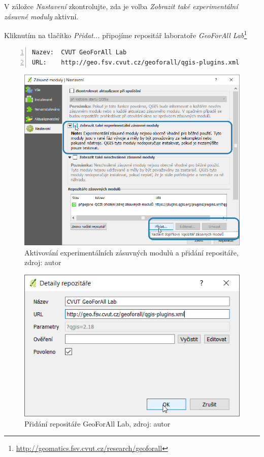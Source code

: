 V záložce \textit{Nastavení} zkontrolujte, zda je volba \textit{Zobrazit také experimentální zásuvné moduly} aktivní.

Kliknutím na tlačítko \textit{Přidat...} připojíme repositář laboratoře \textit{GeoForAll Lab}\footnote{\url{http://geomatics.fsv.cvut.cz/research/geoforall}}

\begin{lstlisting}[basicstyle=\footnotesize\ttfamily, backgroundcolor
= \color{light-gray}, numbers=left, columns=fullflexible,
keepspaces=true]
Nazev:  CVUT GeoForAll Lab
URL:    http://geo.fsv.cvut.cz/geoforall/qgis-plugins.xml
\end{lstlisting}

	\begin{figure}[H] \centering
		\includegraphics[width=.85\textwidth]{./pictures/pridani_repositare.png}
		\caption[Aktivování experimentálních zásuvných modulů a přidání repositáře.]{Aktivování experimentálních zásuvných modulů a přidání repositáře, zdroj: autor}
		\label{manual_pridani_repozitare}
 	\end{figure}
 	
	\begin{figure}[H] \centering
		\includegraphics[width=.6\textwidth]{./pictures/zadani_repositare.png}
		\caption[Přidání repositáře GeoForAll Lab]{Přidání
repositáře GeoForAll Lab, zdroj: autor}
		\label{manual_zadani_repozitare_geoforall_lab}
 	\end{figure}

